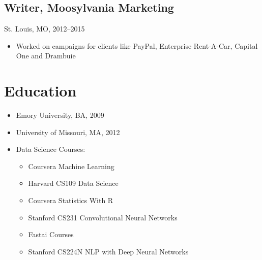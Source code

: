 \documentclass[11pt]{article}
\begin{document}
	\subsection{\normalsize{Writer, Moosylvania Marketing}}
	{\fontsize{10pt}{\parskip}\selectfont St. Louis, MO, 2012--2015}
	\begin{itemize}
		\item Worked on campaigns for clients like PayPal, Enterprise Rent-A-Car, Capital One and Drambuie
	\end{itemize}

	\section{Education}
		\begin{itemize}
      \item Emory University, BA, 2009
			\item University of Missouri, MA, 2012
		  \item Data Science Courses:
				\begin{itemize}[noitemsep,nolistsep]
						\item Coursera Machine Learning
						\item Harvard CS109 Data Science
						\item Coursera Statistics With R
						\item Stanford CS231 Convolutional Neural Networks
						\item Fastai Courses
						\item Stanford CS224N NLP with Deep Neural Networks
				\end{itemize}

		\end{itemize}
\end{document}
